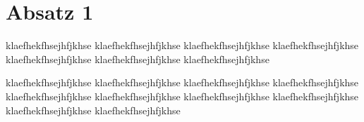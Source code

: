 \section{Absatz 1}
klaefhekfhsejhfjkhse
klaefhekfhsejhfjkhse
klaefhekfhsejhfjkhse
klaefhekfhsejhfjkhse
klaefhekfhsejhfjkhse
klaefhekfhsejhfjkhse
klaefhekfhsejhfjkhse

klaefhekfhsejhfjkhse
klaefhekfhsejhfjkhse
klaefhekfhsejhfjkhse
klaefhekfhsejhfjkhse
klaefhekfhsejhfjkhse
klaefhekfhsejhfjkhse
klaefhekfhsejhfjkhse
klaefhekfhsejhfjkhse
klaefhekfhsejhfjkhse
klaefhekfhsejhfjkhse